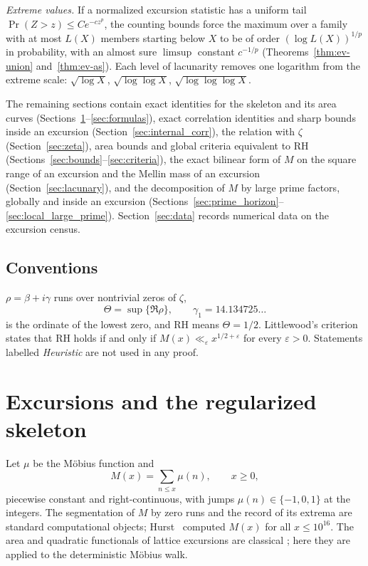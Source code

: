 \documentclass[11pt]{amsart}
\numberwithin{equation}{section}
\theoremstyle{plain}
\theoremstyle{definition}
\theoremstyle{remark}
\newcommand{\eps}{\varepsilon}
\begin{document}
\smallskip\noindent\emph{Extreme values.} If a normalized excursion statistic
has a uniform tail $\Pr(Z>z)\le Ce^{-cz^p}$, the counting bounds force the
maximum over a family with at most $L(X)$ members starting below $X$ to be
of order $(\log L(X))^{1/p}$ in probability, with an almost sure $\limsup$ constant
$c^{-1/p}$ (Theorems~\ref{thm:ev-union} and~\ref{thm:ev-as}). Each level of
lacunarity removes one logarithm from the extreme scale:
$\sqrt{\log X}$, $\sqrt{\log\log X}$, $\sqrt{\log\log\log X}$.

\smallskip
The remaining sections contain exact identities for the skeleton and its area
curves (Sections~\ref{sec:definitions}--\ref{sec:formulas}), exact
correlation identities and sharp bounds inside an excursion
(Section~\ref{sec:internal_corr}), the relation with $\zeta$
(Section~\ref{sec:zeta}), area bounds and global criteria equivalent to RH
(Sections~\ref{sec:bounds}--\ref{sec:criteria}), the exact bilinear form of
$M$ on the square range of an excursion and the Mellin mass of an excursion
(Section~\ref{sec:lacunary}), and the decomposition of $M$ by large prime
factors, globally and inside an excursion
(Sections~\ref{sec:prime_horizon}--\ref{sec:local_large_prime}).
Section~\ref{sec:data} records numerical data on the excursion census.

\subsection*{Conventions}
$\rho=\beta+i\gamma$ runs over nontrivial zeros of $\zeta$,
\[
\Theta=\sup\{\Re\rho\},\qquad \gamma_1=14.134725\ldots
\]
is the ordinate of the lowest zero, and RH means $\Theta=1/2$. Littlewood's
criterion \cite[\S14.25]{Titchmarsh1986} states that RH holds if and only if
$M(x)\ll_\eps x^{1/2+\eps}$ for every $\eps>0$. Statements labelled
\emph{Heuristic} are not used in any proof.

\section{Excursions and the regularized skeleton}
\label{sec:definitions}

Let $\mu$ be the M\"obius function and
\begin{equation}
\label{eq:mertens_def}
M(x)=\sum_{n\le x}\mu(n),\qquad x\ge0,
\end{equation}
piecewise constant and right-continuous, with jumps $\mu(n)\in\{-1,0,1\}$
at the integers. The segmentation of $M$ by zero runs and the record of its
extrema are standard computational objects; Hurst~\cite{Hurst18} computed
$M(x)$ for all $x\le10^{16}$. The area and quadratic functionals of lattice
excursions are classical
\cite{Takacs91,NguyenThe04,Richard05,Janson07,DKW15,CP17}; here they are
applied to the deterministic M\"obius walk.
\end{document}
